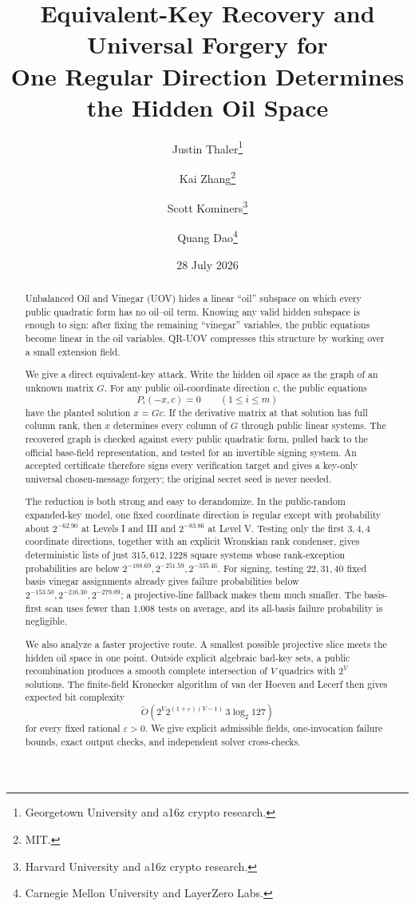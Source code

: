 \documentclass[11pt,a4paper]{article}
\title{\bfseries Equivalent-Key Recovery and Universal Forgery for \QRUOV{}\\ One Regular Direction Determines the Hidden Oil Space}
\author{Justin Thaler\thanks{Georgetown University and a16z crypto research.}
\and Kai Zhang\thanks{MIT.}
\and Scott Kominers\thanks{Harvard University and a16z crypto research.}
\and Quang Dao\thanks{Carnegie Mellon University and LayerZero Labs.}}
\date{28 July 2026}
\theoremstyle{definition}
\theoremstyle{remark}
\newcommand{\QRUOV}{\textsf{QR-UOV}}
\begin{document}
\maketitle

\begin{abstract}
Unbalanced Oil and Vinegar (UOV) hides a linear ``oil'' subspace on which every public quadratic form has no oil--oil term.  Knowing any valid hidden subspace is enough to sign: after fixing the remaining ``vinegar'' variables, the public equations become linear in the oil variables.  \QRUOV{} compresses this structure by working over a small extension field.

We give a direct equivalent-key attack.  Write the hidden oil space as the graph of an unknown matrix $G$.  For any public oil-coordinate direction $c$, the public equations
\[
P_i(-x,c)=0\qquad(1\le i\le m)
\]
have the planted solution $x=Gc$.  If the derivative matrix at that solution has full column rank, then $x$ determines every column of $G$ through public linear systems.  The recovered graph is checked against every public quadratic form, pulled back to the official base-field representation, and tested for an invertible signing system.  An accepted certificate therefore signs every verification target and gives a key-only universal chosen-message forgery; the original secret seed is never needed.

The reduction is both strong and easy to derandomize.  In the public-random expanded-key model, one fixed coordinate direction is regular except with probability about $2^{-62.90}$ at Levels I and III and $2^{-83.86}$ at Level V.  Testing only the first $3,4,4$ coordinate directions, together with an explicit Wronskian rank condenser, gives deterministic lists of just $315,612,1228$ square systems whose rank-exception probabilities are below $2^{-188.69},2^{-251.59},2^{-335.46}$.  For signing, testing $22,31,40$ fixed basis vinegar assignments already gives failure probabilities below $2^{-153.50},2^{-216.30},2^{-279.09}$; a projective-line fallback makes them much smaller.  The basis-first scan uses fewer than $1.008$ tests on average, and its all-basis failure probability is negligible.

We also analyze a faster projective route.  A smallest possible projective slice meets the hidden oil space in one point.  Outside explicit algebraic bad-key sets, a public recombination produces a smooth complete intersection of $V$ quadrics with $2^V$ solutions.  The finite-field Kronecker algorithm of van der Hoeven and Lecerf then gives expected bit complexity
\[
\widetilde O\!\left(2^V2^{(1+\varepsilon)(V-1)}\,3\log_2 127\right)
\]
for every fixed rational $\varepsilon>0$.  We give explicit admissible fields, one-invocation failure bounds, exact output checks, and independent solver cross-checks.


\end{abstract}
\end{document}

